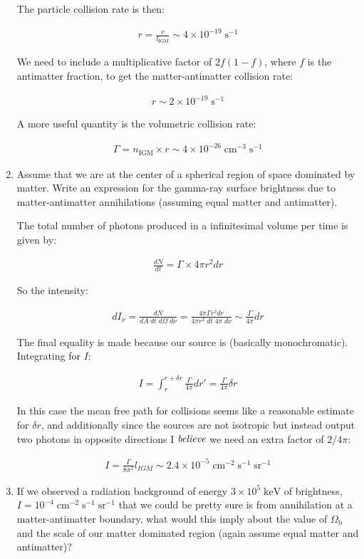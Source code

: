 \documentclass{article}
\def\nIGM{n_\mathrm{IGM}}
\def\beq{\begin{eqnarray}}
\def\eeq{\end{eqnarray}}
\begin{document}
\begin{enumerate}
  The particle collision rate is then:

  \beq
  r = \frac{v}{l_\mathrm{IGM}} \sim 4 \times 10^{-19} \; \mathrm{s^{-1}}
  \eeq

  We need to include a multiplicative factor of $2f(1 - f)$, where $f$ is the antimatter fraction, to get the matter-antimatter collision rate:

  \beq
  r \sim 2 \times 10^{-19} \; \mathrm{s^{-1}}
  \eeq

  A more useful quantity is the volumetric collision rate:

  \beq  
  \Gamma = \nIGM \times r \sim 4 \times 10^{-26} \; \mathrm{cm^{-3}} \; \mathrm{s^{-1}}
  \eeq
  
\item Assume that we are at the center of a spherical region of space dominated by matter. Write an expression for the gamma-ray surface brightness due to matter-antimatter annihilations (assuming equal matter and antimatter).

  The total number of photons produced in a infinitesimal volume per time is given by:

  \beq
  \frac{dN}{dt} = \Gamma \times 4 \pi r^2 dr
  \eeq

  So the intensity:

  \beq
  dI_{\nu} = \frac{dN}{dA \; dt \; d\Omega \; d\nu} = \frac{4 \pi \Gamma r^2 dr}{4 \pi r^2 \; dt \; 4 \pi \; d\nu} \sim \frac{\Gamma}{4 \pi} dr
  \eeq

  The final equality is made because our source is (basically monochromatic). Integrating for $I$:

  \beq
  I = \int_{r}^{r + \delta r} \frac{\Gamma}{4 \pi} dr' = \frac{\Gamma}{4 \pi} \delta r
  \eeq

  In this case the mean free path for collisions seems like a reasonable estimate for $\delta r$, and additionally since the sources are not isotropic but instead output two photons in opposite directions I $\emph{believe}$ we need an extra factor of $2 / 4 \pi$:

  \beq
  I = \frac{\Gamma}{ 8 \pi^2} l_{IGM} \sim 2.4 \times 10^{-5} \; \mathrm{cm^{-2}} \; \mathrm{s^{-1}} \; \mathrm{sr^{-1}} 
  \eeq

\item If we observed a radiation background of energy $3 \times 10^5 \; \mathrm{keV}$ of brightness, $I = 10^{-4} \; \mathrm{cm^{-2}} \; \mathrm{s^{-1}} \; \mathrm{sr^{-1}}$  that we could be pretty sure is from annihilation at a matter-antimatter boundary, what would this imply about the value of $\Omega_\mathrm{b}$ and the scale of our matter dominated region (again assume equal matter and antimatter)?


\end{enumerate}
\end{document}
